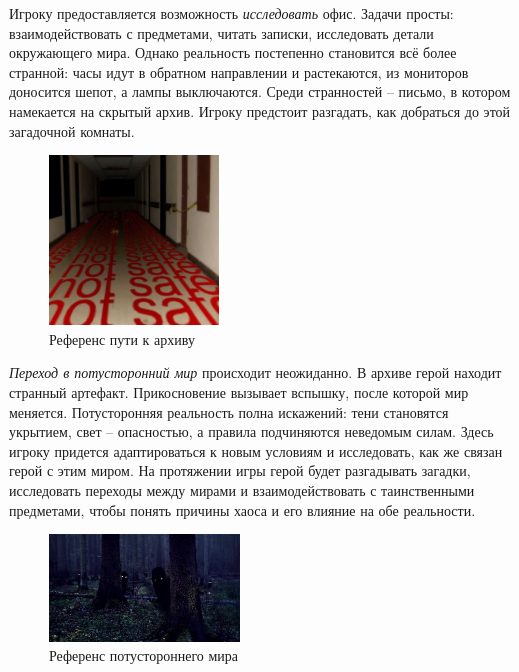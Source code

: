 \documentclass{article}
\begin{document}
	Игроку предоставляется возможность \textit{исследовать} офис. Задачи просты: взаимодействовать с предметами, читать записки, исследовать детали окружающего мира. Однако реальность постепенно становится всё более странной: часы идут в обратном направлении и растекаются, из мониторов доносится шепот, а лампы выключаются. Среди странностей – письмо, в котором намекается на скрытый архив. Игроку предстоит разгадать, как добраться до этой загадочной комнаты.
	
	\begin{figure}[H]
		\centering
		\includegraphics[width=0.4\textwidth]{images/pathtoarchive.jpg}
		\caption{Референс пути к архиву}
		\label{fig:path}
	\end{figure}
	
	\newpage
	\textit{Переход в потусторонний мир} происходит неожиданно. В архиве герой находит странный артефакт. Прикосновение вызывает вспышку, после которой мир меняется. Потусторонняя реальность полна искажений: тени становятся укрытием, свет – опасностью, а правила подчиняются неведомым силам. Здесь игроку придется адаптироваться к новым условиям и исследовать, как же связан герой с этим миром. На протяжении игры герой будет разгадывать загадки, исследовать переходы между мирами и взаимодействовать с таинственными предметами, чтобы понять причины хаоса и его влияние на обе реальности.
	
	\begin{figure}[h]
		\centering
		\includegraphics[width=0.45\textwidth]{images/otherworld.jpg}
		\caption{Референс потустороннего мира}
		\label{fig:otherworld}
	\end{figure}
	
\end{document}
